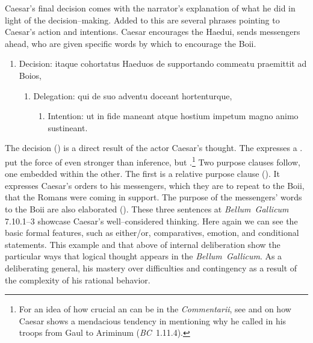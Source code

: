 \documentclass[12pt,letterpaper,oneside,final]{memoir}
\begin{document}
Caesar's final decision comes with the narrator's explanation of what he did in light of the decision--making. Added to this are several phrases pointing to Caesar's action and intentions. Caesar encourages the Haedui, sends messengers ahead, who are given specific words by which to encourage the Boii. \begin{latin} \begin{enumerate} \SingleSpacing
\item Decision: \textlatin{itaque cohortatus Haeduos de supportando commeatu praemittit ad Boios,}
  \begin{enumerate}
  \item Delegation: \textlatin{qui de suo adventu doceant hortenturque,}
    \begin{enumerate}
    \item Intention: \textlatin{ut in fide maneant atque hostium impetum magno animo sustineant.}
    \end{enumerate}
  \end{enumerate}
\end{enumerate} \DoubleSpacing \end{latin} The  decision () is a direct result of the actor Caesar's thought. The  expresses a . \textcite{gildersleeve1895} put the force of  even stronger than inference, but .\footnote{For an idea of how crucial an  can be in the \emph{Commentarii}, see \textcite[186]{raaflaub2009} and \textcite[267]{henderson1996} on how Caesar shows a mendacious tendency in mentioning why he called in his troops from Gaul to Ariminum (\emph{BC}~1.11.4).} Two purpose clauses follow, one embedded within the other. The first is a relative purpose clause (). It expresses Caesar's orders to his messengers, which they are to repeat to the Boii, that the Romans were coming in support. The purpose of the messengers' words to the Boii are also elaborated (). These three sentences at \emph{Bellum~Gallicum} 7.10.1--3 showcase Caesar's well--considered thinking. Here again we can see the basic formal features, such as either/or, comparatives, emotion, and conditional statements. This example and that above of internal deliberation show the particular ways that logical thought appears in the \emph{Bellum~Gallicum}. As a deliberating general, his mastery over difficulties and contingency as a result of the complexity of his rational behavior.
\end{document}
